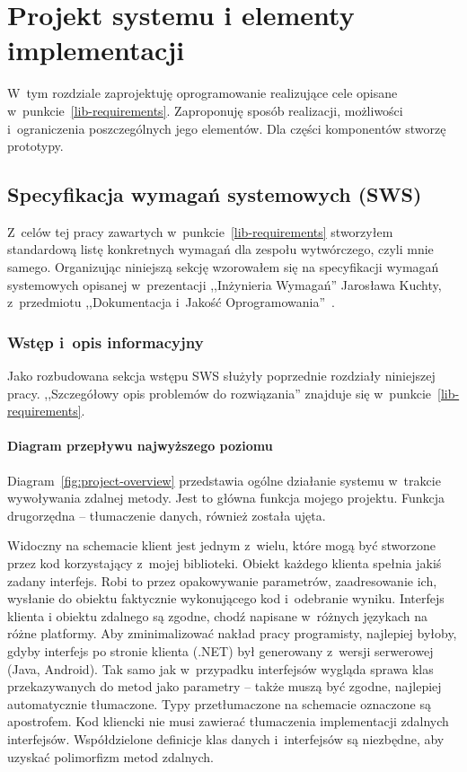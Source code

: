 \chapter{Projekt systemu i elementy implementacji}
W~tym rozdziale zaprojektuję oprogramowanie realizujące cele opisane w~punkcie~\ref{lib-requirements}.
Zaproponuję sposób realizacji, możliwości i~ograniczenia poszczególnych jego elementów. Dla części komponentów stworzę prototypy.

\section{Specyfikacja wymagań systemowych (SWS)}
Z~celów tej pracy zawartych w~punkcie~\ref{lib-requirements} stworzyłem standardową listę konkretnych wymagań dla zespołu wytwórczego, czyli mnie samego.
Organizując niniejszą sekcję wzorowałem się na specyfikacji wymagań systemowych opisanej w~prezentacji ,,Inżynieria Wymagań'' Jarosława Kuchty, z~przedmiotu ,,Dokumentacja i~Jakość Oprogramowania''~\cite{kuchta}.


\subsection{Wstęp i~opis informacyjny}
Jako rozbudowana sekcja wstępu SWS służyły poprzednie rozdziały niniejszej pracy.
,,Szczegółowy opis problemów do rozwiązania'' znajduje się w~punkcie~\ref{lib-requirements}.


\subsubsection{Diagram przepływu najwyższego poziomu}
Diagram~\ref{fig:project-overview} przedstawia ogólne działanie systemu w~trakcie wywoływania zdalnej metody. Jest to główna funkcja mojego projektu. Funkcja drugorzędna -- tłumaczenie danych, również została ujęta.


Widoczny na schemacie klient jest jednym z~wielu, które mogą być stworzone przez kod korzystający z~mojej biblioteki.
Obiekt każdego klienta spełnia jakiś zadany interfejs. Robi to przez opakowywanie parametrów, zaadresowanie ich, wysłanie do obiektu faktycznie wykonującego kod i~odebranie wyniku.
Interfejs klienta i obiektu zdalnego są zgodne, chodź napisane w~różnych językach na różne platformy. Aby zminimalizować nakład pracy programisty, najlepiej byłoby, gdyby interfejs po stronie klienta (.NET) był generowany z~wersji serwerowej (Java, Android).
Tak samo jak w~przypadku interfejsów wygląda sprawa klas przekazywanych do metod jako parametry -- także muszą być zgodne, najlepiej automatycznie tłumaczone.
Typy przetłumaczone na schemacie oznaczone są apostrofem.
Kod kliencki nie musi zawierać tłumaczenia implementacji zdalnych interfejsów.
Współdzielone definicje klas danych i~interfejsów są niezbędne, aby uzyskać polimorfizm metod zdalnych.

